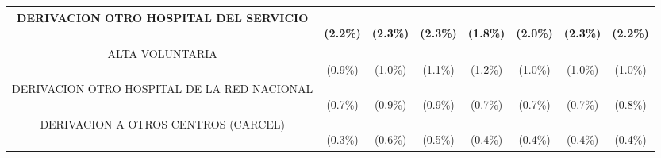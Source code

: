 \begin{table}[htbp]
\begin{tabular}{|c|c|c|c|c|c|c|c|}
\parbox[t]{4.0cm}{\raggedright DERIVACION OTRO HOSPITAL DEL SERVICIO} & \parbox[t]{1.2cm}{\\(2.2\%)} & \parbox[t]{1.2cm}{\\(2.3\%)} & \parbox[t]{1.2cm}{\\(2.3\%)} & \parbox[t]{1.2cm}{\\(1.8\%)} & \parbox[t]{1.2cm}{\\(2.0\%)} & \parbox[t]{1.2cm}{\\(2.3\%)} & \parbox[t]{1.6cm}{\\(2.2\%)} \\ \hline
\parbox[t]{4.0cm}{\raggedright ALTA VOLUNTARIA} & \parbox[t]{1.2cm}{\\(0.9\%)} & \parbox[t]{1.2cm}{\\(1.0\%)} & \parbox[t]{1.2cm}{\\(1.1\%)} & \parbox[t]{1.2cm}{\\(1.2\%)} & \parbox[t]{1.2cm}{\\(1.0\%)} & \parbox[t]{1.2cm}{\\(1.0\%)} & \parbox[t]{1.6cm}{\\(1.0\%)} \\ \hline
\parbox[t]{4.0cm}{\raggedright DERIVACION OTRO HOSPITAL DE LA RED NACIONAL} & \parbox[t]{1.2cm}{\\(0.7\%)} & \parbox[t]{1.2cm}{\\(0.9\%)} & \parbox[t]{1.2cm}{\\(0.9\%)} & \parbox[t]{1.2cm}{\\(0.7\%)} & \parbox[t]{1.2cm}{\\(0.7\%)} & \parbox[t]{1.2cm}{\\(0.7\%)} & \parbox[t]{1.6cm}{\\(0.8\%)} \\ \hline
\parbox[t]{4.0cm}{\raggedright DERIVACION A OTROS CENTROS (CARCEL)} & \parbox[t]{1.2cm}{\\(0.3\%)} & \parbox[t]{1.2cm}{\\(0.6\%)} & \parbox[t]{1.2cm}{\\(0.5\%)} & \parbox[t]{1.2cm}{\\(0.4\%)} & \parbox[t]{1.2cm}{\\(0.4\%)} & \parbox[t]{1.2cm}{\\(0.4\%)} & \parbox[t]{1.6cm}{\\(0.4\%)} \\ \hline

\end{tabular}
\end{table}
